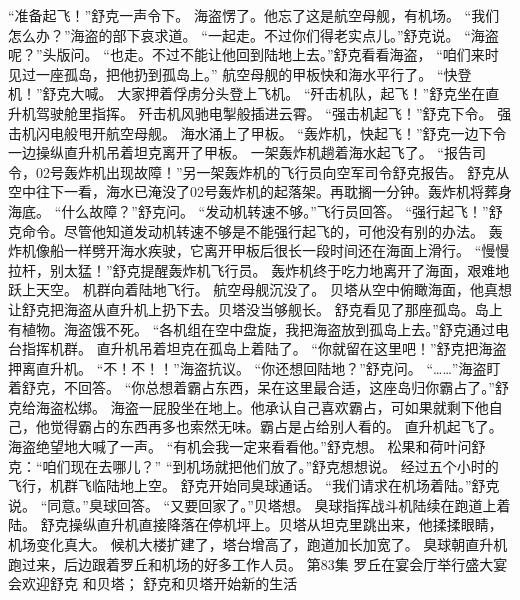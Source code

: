 \documentclass[a4paper,12pt,UTF8,twoside]{ctexbook}
\begin{document}
        “准备起飞！”舒克一声令下。 
        海盗愣了。他忘了这是航空母舰，有机场。 
        “我们怎么办？”海盗的部下哀求道。 
        “一起走。不过你们得老实点儿。”舒克说。 
        “海盗呢？”头版问。 
        “也走。不过不能让他回到陆地上去。”舒克看看海盗，  “咱们来时见过一座孤岛，把他扔到孤岛上。” 
        航空母舰的甲板快和海水平行了。 
        “快登机！”舒克大喊。 
        大家押着俘虏分头登上飞机。 
        “歼击机队，起飞！”舒克坐在直升机驾驶舱里指挥。 
        歼击机风驰电掣般插进云霄。 
        “强击机起飞！”舒克下令。 
        强击机闪电般甩开航空母舰。 
        海水涌上了甲板。 
        “轰炸机，快起飞！”舒克一边下令一边操纵直升机吊着坦克离开了甲板。 
        一架轰炸机趟着海水起飞了。 
        “报告司令，02号轰炸机出现故障！”另一架轰炸机的飞行员向空军司令舒克报告。 
        舒克从空中往下一看，海水已淹没了02号轰炸机的起落架。再耽搁一分钟。轰炸机将葬身海底。 
        “什么故障？”舒克问。 
        “发动机转速不够。”飞行员回答。 
        “强行起飞！”舒克命令。尽管他知道发动机转速不够是不能强行起飞的，可他没有别的办法。 
        轰炸机像船一样劈开海水疾驶，它离开甲板后很长一段时间还在海面上滑行。 
        “慢慢拉杆，别太猛！”舒克提醒轰炸机飞行员。 
        轰炸机终于吃力地离开了海面，艰难地跃上天空。 
        机群向着陆地飞行。 
        航空母舰沉没了。 
        贝塔从空中俯瞰海面，他真想让舒克把海盗从直升机上扔下去。贝塔没当够舰长。 
        舒克看见了那座孤岛。岛上有植物。海盗饿不死。 
        “各机组在空中盘旋，我把海盗放到孤岛上去。”舒克通过电台指挥机群。 
        直升机吊着坦克在孤岛上着陆了。 
        “你就留在这里吧！”舒克把海盗押离直升机。 
        “不！不！！”海盗抗议。 
        “你还想回陆地？”舒克问。 
        “……”海盗盯着舒克，不回答。 
        “你总想着霸占东西，呆在这里最合适，这座岛归你霸占了。”舒克给海盗松绑。 
        海盗一屁股坐在地上。他承认自己喜欢霸占，可如果就剩下他自己，他觉得霸占的东西再多也索然无味。霸占是占给别人看的。 
        直升机起飞了。 
        海盗绝望地大喊了一声。 
        “有机会我一定来看看他。”舒克想。 
        松果和荷叶问舒克：“咱们现在去哪儿？” 
        “到机场就把他们放了。”舒克想想说。 
        经过五个小时的飞行，机群飞临陆地上空。 
        舒克开始同臭球通话。 
        “我们请求在机场着陆。”舒克说。 
        “同意。”臭球回答。 
        “又要回家了。”贝塔想。 
        臭球指挥战斗机陆续在跑道上着陆。 
        舒克操纵直升机直接降落在停机坪上。贝塔从坦克里跳出来，他揉揉眼睛，机场变化真大。 
        候机大楼扩建了，塔台增高了，跑道加长加宽了。 
        臭球朝直升机跑过来，后边跟着罗丘和机场的好多工作人员。   第83集 
        罗丘在宴会厅举行盛大宴会欢迎舒克 
        和贝塔； 
        舒克和贝塔开始新的生活   
\end{document}
